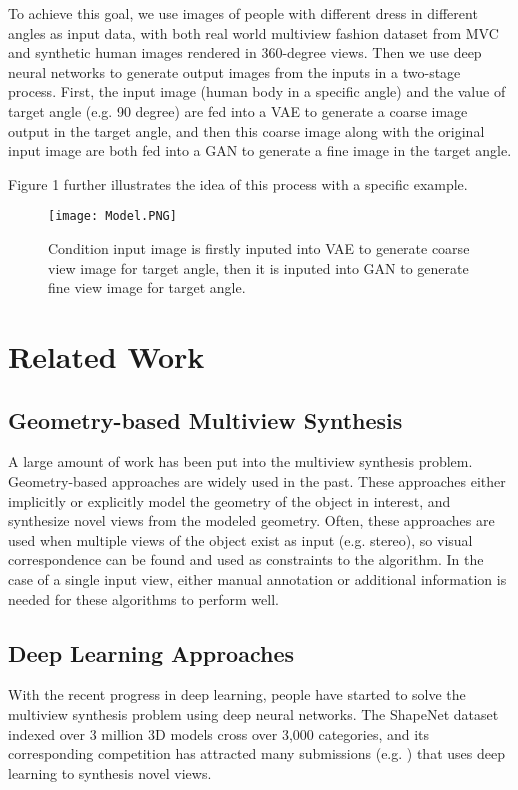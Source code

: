 \documentclass[10pt,conference]{IEEEtran}
\begin{document}
To achieve this goal, we use images of people with different dress in different angles as input data, with both real world multiview fashion dataset from MVC \autocite{liu2016mvc} and synthetic human images rendered in 360-degree views. Then we use deep neural networks to generate output images from the inputs in a two-stage process. First, the input image (human body in a specific angle) and the value of target angle (e.g. 90 degree) are fed into a VAE to generate a coarse image output in the target angle, and then this coarse image along with the original input image are both fed into a GAN to generate a fine image in the target angle.

Figure 1 further illustrates the idea of this process with a specific example.

\begin{figure}[htbp]
\centering
\texttt{[image: Model.PNG]}
\caption{Condition input image is firstly inputed into VAE to generate coarse view image for target angle, then it is inputed into GAN to generate fine view image for target angle.}
\end{figure}


\section{Related Work}

\subsection{Geometry-based Multiview Synthesis}

A large amount of work has been put into the multiview synthesis problem. Geometry-based approaches are widely used in the past. These approaches either implicitly or explicitly model the geometry of the object in interest, and synthesize novel views from the modeled geometry. Often, these approaches are used when multiple views \autocite{furukawa2015multi} of the object exist as input (e.g. stereo), so visual correspondence can be found and used as constraints to the algorithm. In the case of a single input view, either manual annotation \autocite{chen20133} or additional information \autocite{su20143d} is needed for these algorithms to perform well.

\subsection{Deep Learning Approaches}

With the recent progress in deep learning, people have started to solve the multiview synthesis problem using deep neural networks. The ShapeNet dataset \autocite{chang2015shapenet} indexed over 3 million 3D models cross over 3,000 categories, and its corresponding competition has attracted many submissions (e.g. \autocite{zhou2016view, tatarchenko2016multi, park2017transformation}) that uses deep learning to synthesis novel views.
\end{document}
